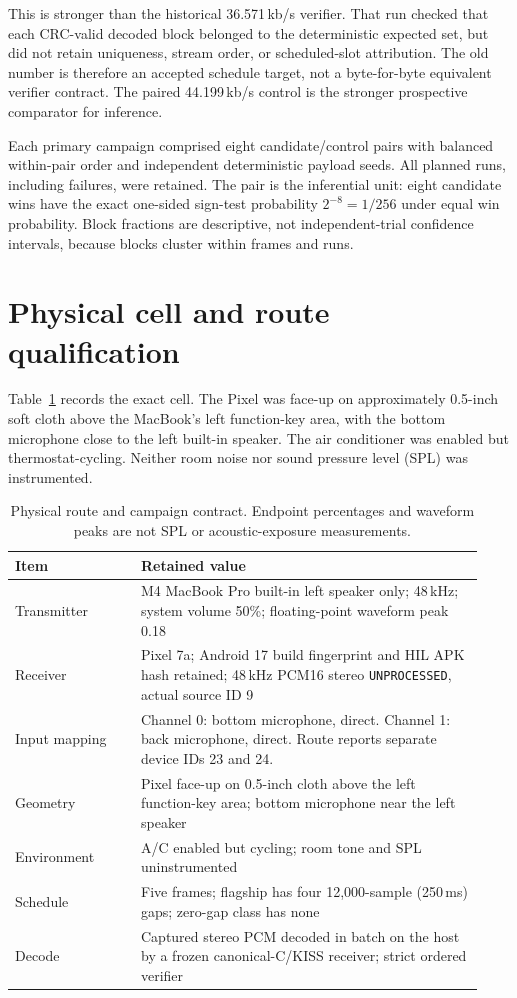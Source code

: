 \documentclass[11pt]{article}
\begin{document}
This is stronger than the historical 36.571\,kb/s verifier. That run checked
that each CRC-valid decoded block belonged to the deterministic expected set,
but did not retain uniqueness, stream order, or scheduled-slot attribution.
The old number is therefore an accepted schedule target, not a byte-for-byte
equivalent verifier contract. The paired 44.199\,kb/s control is the stronger
prospective comparator for inference.

Each primary campaign comprised eight candidate/control pairs with balanced
within-pair order and independent deterministic payload seeds. All planned
runs, including failures, were retained. The pair is the inferential unit:
eight candidate wins have the exact one-sided sign-test probability
$2^{-8}=1/256$ under equal win probability. Block fractions are descriptive,
not independent-trial confidence intervals, because blocks cluster within
frames and runs.

\section{Physical cell and route qualification}
\label{sec:cell}

Table~\ref{tab:cell} records the exact cell. The Pixel was face-up on
approximately 0.5-inch soft cloth above the MacBook's left function-key area,
with the bottom microphone close to the left built-in speaker. The air
conditioner was enabled but thermostat-cycling. Neither room noise nor sound
pressure level (SPL) was instrumented.

\begin{table}[ht]
\centering
\caption{Physical route and campaign contract. Endpoint percentages and
waveform peaks are not SPL or acoustic-exposure measurements.}
\label{tab:cell}
\small
\begin{tabular}{p{0.25\linewidth}p{0.68\linewidth}}
\toprule
Item & Retained value \\
\midrule
Transmitter & M4 MacBook Pro built-in left speaker only; 48\,kHz; system
volume 50\%; floating-point waveform peak 0.18 \\
Receiver & Pixel 7a; Android 17 build fingerprint and HIL APK hash retained;
48\,kHz PCM16 stereo \texttt{UNPROCESSED}, actual source ID 9 \\
Input mapping & Channel 0: bottom microphone, direct. Channel 1: back
microphone, direct. Route reports separate device IDs 23 and 24. \\
Geometry & Pixel face-up on 0.5-inch cloth above the left function-key area;
bottom microphone near the left speaker \\
Environment & A/C enabled but cycling; room tone and SPL uninstrumented \\
Schedule & Five frames; flagship has four 12,000-sample (250\,ms) gaps;
zero-gap class has none \\
Decode & Captured stereo PCM decoded in batch on the host by a frozen
canonical-C/KISS receiver; strict ordered verifier \\
\bottomrule
\end{tabular}
\end{table}
\end{document}
